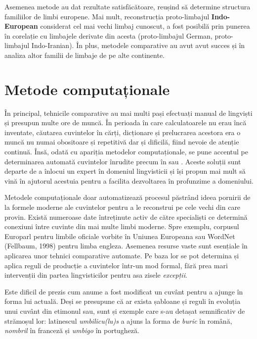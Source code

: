 Asemenea metode au dat rezultate satisfăcătoare, reușind să determine structura familiilor de limbi
europene. Mai mult, reconstrucția proto-limbajul \textbf{Indo-European} considerat cel mai vechi
limbaj cunoscut, a fost posibilă prin punerea în corelație cu limbajele derivate din acesta 
(proto-limbajul German, proto-limbajul Indo-Iranian).\cite{protostuff} În plus, metodele comparative
au avut avut succes și în analiza altor familii de limbaje de pe alte continente.

\section{Metode computaționale}
În principal, tehnicile comparative au mai multi pași efectuați manual de lingviști și presupun 
multe ore de muncă. În perioada în care calculatoarele nu erau încă inventate, căutarea cuvintelor 
în cărți, dicționare și prelucrarea acestora era o muncă nu numai obositoare și repetitivă dar și 
dificilă, fiind nevoie de atenție continuă. Însă, odată cu apariția metodelor computaționale, se pune accentul
pe determinarea automată cuvintelor înrudite precum în \cite{kondrak} sau \cite{list}. Aceste
soluții sunt departe de a înlocui un expert în domeniul lingvisticii și își propun mai mult să vină
în ajutorul acestuia pentru a facilita dezvoltarea în profunzime a domeniului.

Metodele computaționale doar automatizează procesul păstrând ideea pornirii de la formele moderne
ale cuvintelor pentru a le reconstrui pe cele vechi din care provin. Există numeroase date întreținute
activ de către specialiști ce determină conexiuni între cuvinte din mai multe limbi moderne. Spre
exemplu, corpusul Europarl pentru limbile oficiale vorbite în Uniunea Europeana sau WordNet (Fellbaum, 1998)
pentru limba engleza. Asemenea resurse vaste sunt esențiale în aplicarea unor tehnici comparative 
automate. Pe baza lor se pot determina și aplica reguli de producție a cuvintelor într-un mod formal,
fără prea mari intervenții din partea lingvisticilor pentru asa zisele \textit{excepții}.

Este dificil de prezis cum anume a fost modificat un cuvânt pentru a ajunge în forma lui actuală.
Deși se presupune că ar exista șabloane și reguli în evoluția unui cuvânt din etimonul sau, sunt
și exemple care s-au detașat semnificativ de strămoșul lor: latinescul \textit{umbilicu(lu)s} a ajuns
la forma de \textit{buric} în română, \textit{nombril} în franceză și \textit{umbigo} în portugheză.

